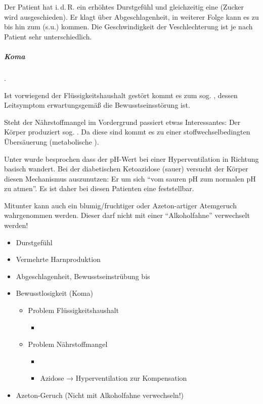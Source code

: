 {
Der Patient hat i.\,d.\,R. ein erhöhtes Durstgefühl und gleichzeitig eine
 (Zucker wird ausgeschieden). Er klagt über
Abgeschlagenheit, in weiterer Folge kann es zu  bis
hin zum  (s.u.) kommen. Die Geschwindigkeit der Veschlechterung ist je
nach Patient sehr unterschiedlich.

\subparagraph{Koma} \label{topic:koma-diabetisches}  . 

Ist vorwiegend der Flüssigkeitshaushalt gestört kommt es zum sog.
, dessen Leitsymptom erwartungsgemäß die
Bewusstseinsstörung ist.

Steht der Nährstoffmangel im Vordergrund passiert etwas Interessantes: Der
Körper produziert sog. . Da diese  sind kommt es zu
einer stoffwechselbedingten Übersäuerung (metabolische 
).

Unter  wurde besprochen dass der pH-Wert
bei einer Hyperventilation in Richtung basisch wandert. Bei der diabetischen
Ketoazidose (sauer) versucht der Körper diesen Mechanismus auszunutzen: Er  um sich "`vom sauren pH
    zum normalen pH zu atmen"'. Es ist daher bei diesen Patienten eine
     feststellbar.

Mitunter kann auch ein blumig/fruchtiger oder Azeton-artiger Atemgeruch
wahrgenommen werden. Dieser darf nicht mit einer "`Alkoholfahne"' verwechselt
werden! 
}{
\begin{itemize}
  \item Durstgefühl
  \item Vermehrte Harnproduktion
  \item Abgeschlagenheit, Bewusstseinstrübung bis
  \item Bewusstlosigkeit (Koma)
  \begin{itemize}
    \item Problem Flüssigkeitshaushalt
    \begin{itemize}
      \item {}
    \end{itemize}
    \item Problem Nährstoffmangel
    \begin{itemize}
      \item {}
      \item Azidose → Hyperventilation zur Kompensation
    \end{itemize}
  \end{itemize}
  \item Azeton-Geruch (Nicht mit Alkoholfahne verwechseln!)
\end{itemize}
}{}{}{}




